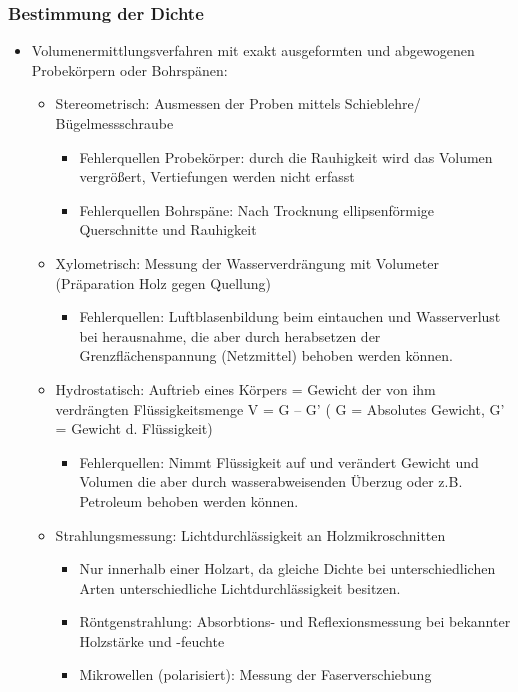 \documentclass[12pt]{article}
\begin{document}
\subsubsection{Bestimmung der Dichte}
\begin{itemize}
  \item Volumenermittlungsverfahren mit exakt ausgeformten und abgewogenen
  Probekörpern oder Bohrspänen:
  \begin{itemize}
    \item Stereometrisch: Ausmessen der Proben mittels Schieblehre/
    Bügelmessschraube
    \begin{itemize}
      \item Fehlerquellen Probekörper: durch die Rauhigkeit wird das Volumen
      vergrößert, Vertiefungen werden nicht erfasst
      \item Fehlerquellen Bohrspäne: Nach Trocknung ellipsenförmige
      Querschnitte und Rauhigkeit
    \end{itemize}
  \end{itemize}
  \begin{itemize}
    \item Xylometrisch: Messung der Wasserverdrängung mit Volumeter
    (Präparation Holz gegen Quellung)
    \begin{itemize}
      \item Fehlerquellen: Luftblasenbildung beim eintauchen und Wasserverlust
      bei herausnahme, die aber durch herabsetzen der Grenzflächenspannung
      (Netzmittel) behoben werden können.
    \end{itemize}
  \end{itemize}
  \begin{itemize}
    \item Hydrostatisch: Auftrieb  eines Körpers = Gewicht
    der von ihm verdrängten Flüssigkeitsmenge V = G – G' ( G = Absolutes
    Gewicht, G' = Gewicht d. Flüssigkeit)
    \begin{itemize}
      \item Fehlerquellen: Nimmt Flüssigkeit auf und verändert Gewicht und
      Volumen die aber durch wasserabweisenden Überzug oder z.B. Petroleum
      behoben werden können.
    \end{itemize}
  \end{itemize}
  \begin{itemize}
    \item Strahlungsmessung: Lichtdurchlässigkeit an Holzmikroschnitten
    \begin{itemize}
      \item Nur innerhalb einer Holzart, da gleiche Dichte bei
      unterschiedlichen Arten unterschiedliche Lichtdurchlässigkeit besitzen.
      \item Röntgenstrahlung: Absorbtions- und Reflexionsmessung bei bekannter
      Holzstärke und -feuchte
      \item Mikrowellen (polarisiert): Messung der Faserverschiebung
    \end{itemize}
  \end{itemize}
  
\end{itemize}
 
\end{document}
